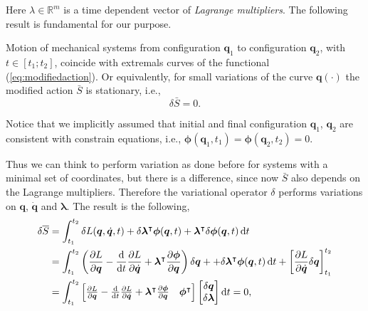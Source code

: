 		Here $\lambda\in\mathbb{R}^{m}$ is a time dependent vector of \emph{Lagrange multipliers}. The following result is fundamental for our purpose.
		\begin{theorem}
			Motion of mechanical systems from configuration $\bm{q}_{1}$ to configuration $\bm{q}_{2}$, with $t\in[t_{1}; t_{2}]$, coincide with extremals curves of the functional (\ref{eq:modifiedaction}). Or equivalently, for small variations of the curve $\bm{q}(\cdot)$ the modified action $\bar{S}$ is stationary, i.e.,
			\begin{equation*}
				\delta\bar{S} = 0.
			\end{equation*}
		\end{theorem}
		\begin{remark}
			Notice that we implicitly assumed that initial and final configuration $\bm{q}_{1}$, $\bm{q}_{2}$ are consistent with constrain equations, i.e., $\bm{\phi}(\bm{q}_{1},t_{1}) = \bm{\phi}(\bm{q}_{2},t_{2})= 0$.
		\end{remark}
		Thus we can think to perform variation as done before for systems with a minimal set of coordinates, but there is a difference, since now $\bar{S}$ also depends on the Lagrange multipliers. Therefore the variational operator $\delta$ performs variations on $\bm{q}$, $\bm{\dot{q}}$ and $\bm{\lambda}$. The result is the following,
		\begin{subequations}
			\begin{align}
				\label{eq:variationmodifiedaction}
				\delta\overline{S} &= \int_{t_{1}}^{t_{2}}\delta L(\bm{q},\dot{\bm{q}},t)+\delta\bm{\lambda}^{\intercal}\bm{\phi}(\bm{q},t)+\bm{\lambda}^{\intercal}\delta\bm{\phi}(\bm{q},t)\mathop{}\!\mathrm{d} t\\
				&=  \int_{t_{1}}^{t_{2}}\left(\frac{\partial L}{\partial\bm{q}} - \frac{\mathop{}\!\mathrm{d}}{\mathop{}\!\mathrm{d} t}\frac{\partial L}{\partial\dot{\bm{q}}}+\bm{\lambda}^{\intercal}\frac{\partial\bm{\phi}}{\partial\bm{q}}\right)\delta\bm{q} + +\delta\bm{\lambda}^{\intercal}\bm{\phi}(\bm{q},t)\mathop{}\!\mathrm{d} t + \left[\frac{\partial L}{\partial\dot{\bm{q}}}\delta\bm{q} \right]_{t_{1}}^{t_{2}}\\
				&=\int_{t_{1}}^{t_{2}}
				\begin{bmatrix}
					\frac{\partial L}{\partial\bm{q}} - \frac{\mathop{}\!\mathrm{d}}{\mathop{}\!\mathrm{d} t}\frac{\partial L}{\partial\dot{\bm{q}}} + \bm{\lambda}^{\intercal}\frac{\partial\bm{\phi}}{\partial\bm{q}} & \bm{\phi}^{\intercal}
				\end{bmatrix}
				\begin{bmatrix}
					\delta\bm{q} \\
					\delta\bm{\lambda}
				\end{bmatrix} \mathop{}\!\mathrm{d} t = 0,
			\end{align}
		\end{subequations} 
